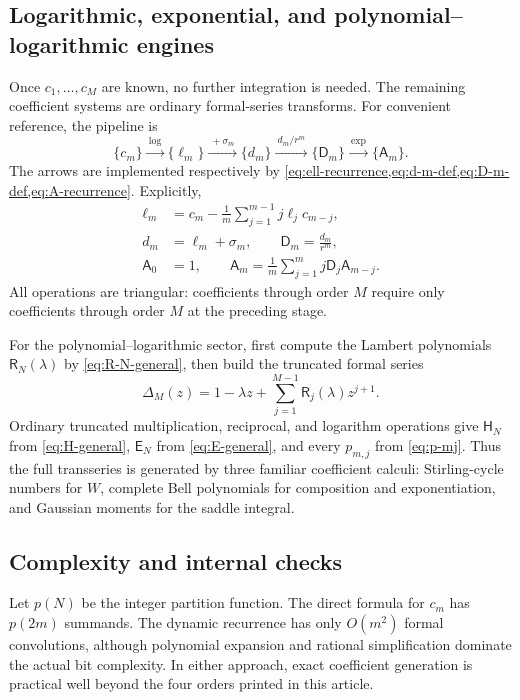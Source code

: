 \documentclass[11pt,a4paper]{article}
\theoremstyle{definition}
\theoremstyle{remark}
\newcommand{\cA}{\mathsf A}
\newcommand{\cD}{\mathsf D}
\newcommand{\cR}{\mathsf R}
\newcommand{\cH}{\mathsf H}
\newcommand{\cE}{\mathsf E}
\begin{document}
\subsection{Logarithmic, exponential, and polynomial--logarithmic engines}

Once \(c_1,\ldots,c_M\) are known, no further integration is needed.
The remaining coefficient systems are ordinary formal-series transforms.
For convenient reference, the pipeline is
\begin{equation}\label{eq:coefficient-pipeline}
 \{c_m\}
 \xrightarrow{\ \log\ }
 \{\ell_m\}
 \xrightarrow{\ +\sigma_m\ }
 \{d_m\}
 \xrightarrow{\ d_m/r^m\ }
 \{\cD_m\}
 \xrightarrow{\ \exp\ }
 \{\cA_m\}.
\end{equation}
The arrows are implemented respectively by
\cref{eq:ell-recurrence,eq:d-m-def,eq:D-m-def,eq:A-recurrence}.  Explicitly,
\begin{align}
 \ell_m
 &=c_m-\frac1m\sum_{j=1}^{m-1}j\ell_jc_{m-j},
 \label{eq:algorithm-log}\\
 d_m&=\ell_m+\sigma_m,
 \qquad
 \cD_m=\frac{d_m}{r^m},
 \label{eq:algorithm-dD}\\
 \cA_0&=1,
 \qquad
 \cA_m=\frac1m\sum_{j=1}^{m}j\cD_j\cA_{m-j}.
 \label{eq:algorithm-exp}
\end{align}
All operations are triangular: coefficients through order \(M\) require only
coefficients through order \(M\) at the preceding stage.

For the polynomial--logarithmic sector, first compute the Lambert polynomials
\(\cR_N(\lambda)\) by \cref{eq:R-N-general}, then build the truncated formal
series
\begin{equation}\label{eq:algorithm-Delta}
 \Delta_M(z)=1-\lambda z+
             \sum_{j=1}^{M-1}\cR_j(\lambda)z^{j+1}.
\end{equation}
Ordinary truncated multiplication, reciprocal, and logarithm operations give
\(\cH_N\) from \cref{eq:H-general}, \(\cE_N\) from
\cref{eq:E-general}, and every \(p_{m,j}\) from \cref{eq:p-mj}.  Thus the
full transseries is generated by three familiar coefficient calculi:
Stirling-cycle numbers for \(W\), complete Bell polynomials for composition
and exponentiation, and Gaussian moments for the saddle integral.

\subsection{Complexity and internal checks}

Let \(p(N)\) be the integer partition function.  The direct formula for
\(c_m\) has \(p(2m)\) summands.  The dynamic recurrence has only
\(O(m^2)\) formal convolutions, although polynomial expansion and rational
simplification dominate the actual bit complexity.  In either approach, exact
coefficient generation is practical well beyond the four orders printed in
this article.
\end{document}
